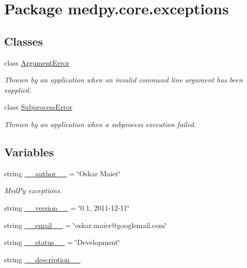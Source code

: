 \hypertarget{namespacemedpy_1_1core_1_1exceptions}{
\section{Package medpy.core.exceptions}
\label{namespacemedpy_1_1core_1_1exceptions}
}
\subsection*{Classes}
\begin{DoxyCompactItemize}
\item 
class \hyperlink{classmedpy_1_1core_1_1exceptions_1_1ArgumentError}{ArgumentError}
\begin{DoxyCompactList}\small\item\em Thrown by an application when an invalid command line argument has been supplied. \end{DoxyCompactList}\item 
class \hyperlink{classmedpy_1_1core_1_1exceptions_1_1SubprocessError}{SubprocessError}
\begin{DoxyCompactList}\small\item\em Thrown by an application when a subprocess execution failed. \end{DoxyCompactList}\end{DoxyCompactItemize}
\subsection*{Variables}
\begin{DoxyCompactItemize}
\item 
string \hyperlink{namespacemedpy_1_1core_1_1exceptions_a5599a8a054f06dfd6bd0f44ffbf6d522}{\_\-\_\-author\_\-\_\-} = \char`\"{}Oskar Maier\char`\"{}
\begin{DoxyCompactList}\small\item\em MedPy exceptions. \end{DoxyCompactList}\item 
string \hyperlink{namespacemedpy_1_1core_1_1exceptions_a2bd51ce1d4911fc0dbe5506aabc2af2d}{\_\-\_\-version\_\-\_\-} = \char`\"{}0.1, 2011-\/12-\/11\char`\"{}
\item 
string \hyperlink{namespacemedpy_1_1core_1_1exceptions_a6000fcb2687e2b3171c593295d651f2e}{\_\-\_\-email\_\-\_\-} = \char`\"{}oskar.maier@googlemail.com\char`\"{}
\item 
string \hyperlink{namespacemedpy_1_1core_1_1exceptions_a6d24d4a0cf677ec046471cd2aafe73fd}{\_\-\_\-status\_\-\_\-} = \char`\"{}Development\char`\"{}
\item 
string \hyperlink{namespacemedpy_1_1core_1_1exceptions_a9db40ab8020b9943fe61ac5e252f2b61}{\_\-\_\-description\_\-\_\-}
\end{DoxyCompactItemize}


